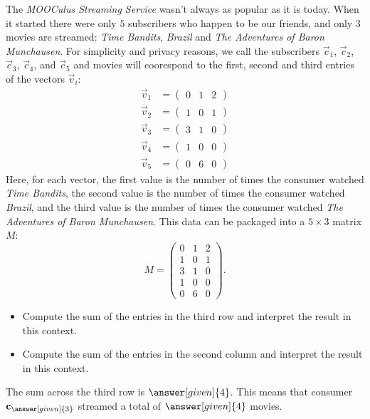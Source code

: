 \documentclass{ximera}
\begin{document}
\begin{example}
  The \textit{MOOCulus Streaming Service} wasn't always as popular as
  it is today. When it started there were only $5$ subscribers who
  happen to be our friends, and only $3$ movies are streamed:
  \textit{Time Bandits}, \textit{Brazil} and \textit{The Adventures of Baron
    Munchausen}. For simplicity and privacy reasons, we call the
  subscribers $\vec c_1$, $\vec c_2$, $\vec c_3$, $\vec c_4$, and
  $\vec c_5$ and movies will coorespond to the first, second and third
  entries of the vectors $\vec v_i$:
  \begin{align*}
    \vec v_{1} &= \begin{pmatrix}0 & 1 & 2\end{pmatrix}\\
    \vec v_{2} &= \begin{pmatrix}1 & 0 & 1\end{pmatrix}\\
    \vec v_{3} &= \begin{pmatrix}3 & 1 & 0\end{pmatrix}\\
    \vec v_{4} &= \begin{pmatrix}1 & 0 & 0\end{pmatrix}\\
    \vec v_{5} &= \begin{pmatrix}0 & 6 & 0\end{pmatrix}
  \end{align*}
  Here, for each vector, the first value is the number of times the
  consumer watched \textit{Time Bandits}, the second value is the
  number of times the consumer watched \textit{Brazil}, and the third
  value is the number of times the consumer watched \textit{The
    Adventures of Baron Munchausen}.  This data can be packaged into a
  $5 \times 3$ matrix $M$:
  \[
    M =
    \begin{pmatrix}
      0 & 1 & 2\\
      1 & 0 & 1\\
      3 & 1 & 0\\
      1 & 0 & 0\\
      0 & 6 & 0
    \end{pmatrix}.
  \]
  \begin{itemize}
  \item Compute the sum of the entries in the third row and interpret the result in this context.
  \item Compute the sum of the entries in the second column and interpret the result in this context.
  \end{itemize}
  \begin{explanation}
    The sum across the third row is $\answer[given]{4}$. This means
    that consumer $\vec{c}_{\answer[given]{3}}$ streamed a total of  $\answer[given]{4}$  movies.



\end{explanation}
\end{example}
\end{document}
